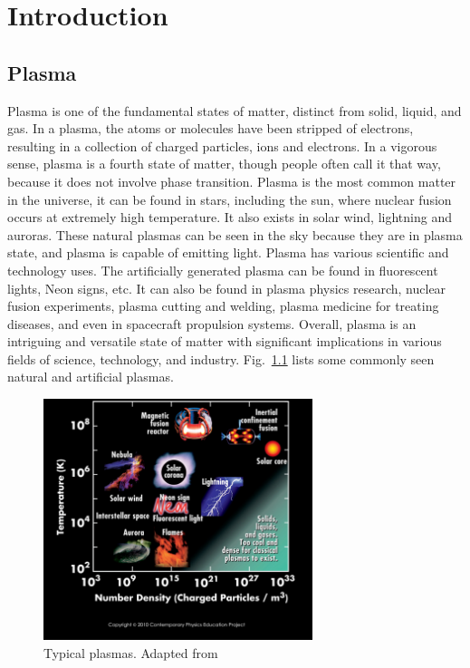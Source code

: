 \chapter{Introduction}
\section{Plasma}
Plasma is one of the fundamental states of matter, distinct from solid, liquid, and gas. \cite{chen_introduction_2016} In a plasma, the atoms or molecules have been stripped of electrons, resulting in a collection of charged particles, ions and electrons. In a vigorous sense, plasma is a fourth state of matter, though people often call it that way, because it does not involve phase transition. Plasma is the most common matter in the universe, it can be found in stars, including the sun, where nuclear fusion occurs at extremely high temperature. It also exists in solar wind, lightning and auroras. These natural plasmas can be seen in the sky because they are in plasma state, and plasma is capable of emitting light. \cite{chen_introduction_2016} Plasma has various scientific and technology uses. The artificially generated plasma can be found in fluorescent lights, Neon signs, etc. It can also be found in plasma physics research, nuclear fusion experiments, plasma cutting and welding, plasma medicine for treating diseases, and even in spacecraft propulsion systems. Overall, plasma is an intriguing and versatile state of matter with significant implications in various fields of science, technology, and industry. Fig.~\ref{fig:plasma-properties} lists some commonly seen natural and artificial plasmas.

\begin{figure}[htbp]
	\centering
	\includegraphics[width=0.7\textwidth]{figures/plasma-properties}
	\caption{Typical plasmas. Adapted from \cite{cpep_physics}}
	\label{fig:plasma-properties}
\end{figure}

